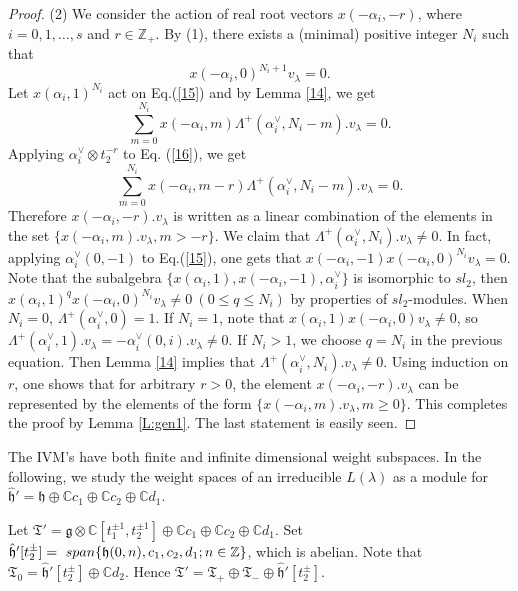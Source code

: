 \documentclass[11pt]{amsproc}
\theoremstyle{definition}
\theoremstyle{remark}
\numberwithin{equation}{section} \errorcontextlines=0
\begin{document}
\begin{proof}
(2) We consider the action of real root vectors $x(-\alpha_i, -r)$,
where $i=0,1,\ldots,s$ and $r\in\mathbb Z_+$. By (1), there exists a
(minimal) positive integer $N_i$ such
that
\begin{equation}\label{15}
x(-\alpha_i,0)^{N_i+1}v_{\lambda}=0.
\end{equation}
 Let $x(\alpha_i, 1)^{N_i}$ act on Eq.(\ref{15}) and
by Lemma \ref{14}, we get
\begin{equation}\label{16}
\sum
\limits_{m=0}^{N_i}x(-\alpha_i,m)\Lambda^+(\alpha_i^{\vee},N_i-m).v_{\lambda}=0.
\end{equation}
Applying 
$\alpha_i^{\vee}\otimes t_2^{-r}$ to Eq.
(\ref{16}), we get
\begin{equation}\label{17}
\sum
\limits_{m=0}^{N_i}x(-\alpha_i,m-r)\Lambda^+(\alpha_i^{\vee},N_i-m).v_{\lambda}=0.
\end{equation}
Therefore $x(-\alpha_i,-r).v_{\lambda}$ is written as a linear
combination of the elements in the set
$\{x(-\alpha_i,m).v_{\lambda}, m>-r\}$.
We claim that $\Lambda^+(\alpha_i^{\vee},N_i).v_{\lambda}\neq 0$. In fact,
applying $\alpha_i^{\vee}(0,-1)$ to Eq.(\ref{15}), one gets that
$x(-\alpha_i,-1)x(-\alpha_i,0)^{N_i}v_{\lambda}=0$. Note that the
subalgebra $\{x(\alpha_i,1),x(-\alpha_i,-1),\alpha_i^{\vee}\}$ is
isomorphic to $sl_2$, then
$x(\alpha_i,1)^{q}x(-\alpha_i,0)^{N_i}v_{\lambda}\neq0~(0 \leq q
\leq N_i)$ by properties of $sl_2$-modules. When $N_i=0$,
$\Lambda^+(\alpha_i^{\vee},0)=1$. If $N_i=1$,
note that $x(\alpha_i,1)x(-\alpha_i,0)v_{\lambda}\neq0$, so
$\Lambda^+(\alpha_i^{\vee},1).v_{\lambda}=-\alpha_i^{\vee}(0,i).v_{\lambda}\neq0$.
If $N_i> 1$, we choose $q=N_i$ in the previous equation. Then Lemma \ref{14} implies that
$\Lambda^+(\alpha_i^{\vee},N_i).v_{\lambda}\neq 0$.
Using induction
on $r$, one shows that for arbitrary $r>0$, the element
$x(-\alpha_i,-r).v_{\lambda}$ can be represented by the elements of
the form $\{x(-\alpha_i,m).v_{\lambda}, m\geq 0\}$. This completes
the proof by Lemma \ref{L:gen1}. The last statement is easily seen.

\end{proof}

The IVM's have both finite and infinite dimensional weight
subspaces. In the following, we study the weight spaces
of an irreducible $L(\lambda)$ as a
module for
$\hat{\mathfrak{h}}'=\mathfrak{h}\oplus\mathbb{C}c_1\oplus\mathbb{C}c_2\oplus\mathbb{C}d_1$.

Let $\mathfrak
T'=\mathfrak{g}\otimes\mathbb{C}[t_1^{\pm1},t_2^{\pm1}]
\oplus\mathbb{C}c_1\oplus\mathbb{C}c_2\oplus\mathbb{C}d_1$. Set
$\hat{\mathfrak h}'[t_2^{\pm}]=\
span\{\mathfrak{h}(0,n),c_1,\\c_2,d_1; n\in\mathbb{Z}\}$, which is
abelian. Note that $\mathfrak T_{0}=\hat{\mathfrak h}'[t_2^{\pm}]
\oplus\mathbb{C}d_2$. Hence ${\mathfrak T'}=\mathfrak
T_+\oplus\mathfrak T_-\oplus\hat{\mathfrak h}'[t_2^{\pm}]$.
\end{document}
